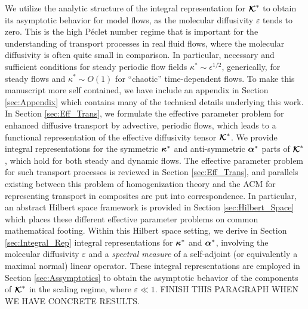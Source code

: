 \documentclass[11pt]{amsart}
\newcommand\Kbc{\mbox{\boldmath${\mathcal{K}}$}}
\newcommand\balpha{\mbox{\boldmath${\alpha}$}}
\newcommand\bkappa{\mbox{\boldmath${\kappa}$}}
\begin{document}
We utilize the analytic structure of the  integral
representation for $\Kbc^*$ to obtain its asymptotic behavior for
model flows, as the molecular diffusivity $\varepsilon$ tends to zero. This is
the high P\'{e}clet number regime that is important for the
understanding of transport processes in real fluid flows, where the
molecular diffusivity is often quite small in comparison. In
particular, 
necessary and sufficient conditions for steady periodic flow
fields $\kappa^*\sim\epsilon^{1/2}$, generically, for steady flows and $\kappa^*\sim O(1)$ for
``chaotic'' time-dependent flows. To make this manuscript more self
contained, we have include an appendix in Section \ref{sec:Appendix}
which contains many of the technical details underlying this work.
In Section \ref{sec:Eff_Trans}, we formulate the effective parameter
problem for enhanced diffusive transport by advective, periodic flows,
which leads to a functional representation of the effective
diffusivity tensor $\Kbc^*$. We provide integral representations for
the symmetric 
$\bkappa^*$ and anti-symmetric $\balpha^*$ parts of $\Kbc^*$, which
hold for both steady and dynamic flows. The effective parameter
problem
\cite{McLaughlin:SIAM_JAM:780,Fannjiang:SIAM_JAM:333,Biferale:PF:2725} 
for such transport processes is reviewed in Section
\ref{sec:Eff_Trans}, and parallels existing between this problem
of homogenization theory \cite{Bensoussan:Book:1978} and the ACM for
representing transport in composites \cite{Golden:CMP-473} are put
into correspondence. In particular, an abstract Hilbert space
framework is provided in Section \ref{sec:Hilbert_Space} which places
these different effective parameter problems on common mathematical
footing. Within this Hilbert space setting, we derive in Section
\ref{sec:Integral_Rep} integral representations for $\bkappa^*$ and
$\balpha^*$, involving the molecular diffusivity $\varepsilon$ and a
\emph{spectral measure} of a self-adjoint (or equivalently a maximal
normal) linear operator. These integral representations are employed
in Section \ref{sec:Assymptotics} to obtain the asymptotic behavior of
the components of $\Kbc^*$ in the scaling regime, where $\varepsilon\ll1$.  
FINISH THIS PARAGRAPH WHEN WE HAVE CONCRETE RESULTS.
\end{document}
